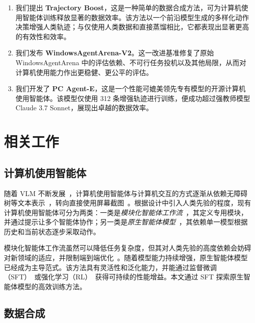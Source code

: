\documentclass[10pt]{article}
\renewcommand{\cite}{\citep}
\begin{document}
\begin{enumerate}
    \item 我们提出 \textbf{Trajectory Boost}，这是一种简单的数据合成方法，可为计算机使用智能体训练释放显著的数据效率。该方法以一个前沿模型生成的多样化动作决策增强人类轨迹；与仅使用人类数据和直接蒸馏相比，它都表现出显著更高的有效性和效率。
    \item 我们发布 \textbf{WindowsAgentArena-V2}。这一改进基准修复了原始 WindowsAgentArena 中的评估依赖、不可行任务投机以及其他局限，从而对计算机使用能力作出更稳健、更公平的评估。
    \item 我们开发了 \textbf{PC Agent-E}，这是一个性能可媲美领先专有模型的开源计算机使用智能体。该模型仅使用 312 条增强轨迹进行训练，便成功超过强教师模型 Claude 3.7 Sonnet，展现出卓越的数据效率。
\end{enumerate}

\section{相关工作}
\label{gen_inst}

\subsection{计算机使用智能体}

随着 VLM 不断发展~\cite{bai2025qwen25vltechnicalreport,deitke2024molmo}，计算机使用智能体与计算机交互的方式逐渐从依赖无障碍树等文本表示~\cite{2024agents,wu2024oscopilot}，转向直接使用屏幕截图~\cite{uitars2025,xu2025aguvisunifiedpurevision,he2024pcagentsleepai}。根据设计中引入人类先验的程度，现有计算机使用智能体可分为两类：一类是\textit{模块化智能体工作流}~\cite{2024agents,wu2024oscopilot}，其定义专用模块，并通过提示让多个智能体协作；另一类是\textit{原生智能体模型}~\cite{2024claudecomputeruse,uitars2025,2025openaicua}，其依赖单一模型根据历史和当前状态逐步采取动作。

模块化智能体工作流虽然可以降低任务复杂度，但其对人类先验的高度依赖会妨碍对新领域的适应，并限制端到端优化~\cite{SaltzerReedClark1984end2end,pan2024swegym}。随着模型能力持续增强，原生智能体模型已经成为主导范式。该方法具有灵活性和泛化能力，并能通过监督微调（SFT）~\cite{xu2025aguvisunifiedpurevision}或强化学习（RL）~\cite{2025openaicua}获得可持续的性能增益。本文通过 SFT 探索原生智能体模型的高效训练方法。

\subsection{数据合成}
\end{document}
